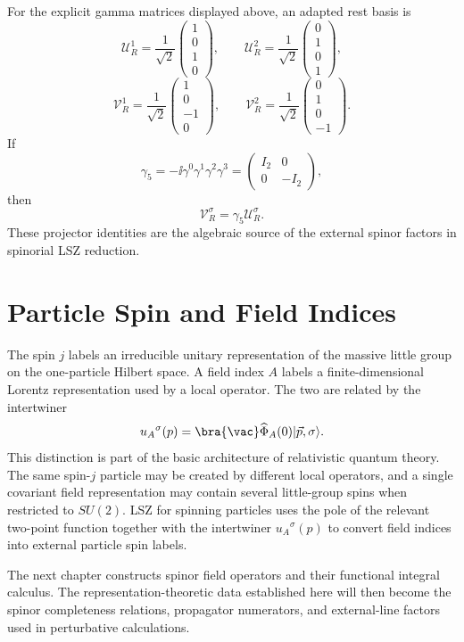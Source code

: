 For the explicit gamma matrices displayed above, an adapted rest basis is
\[
  \mathcal U_R^1=\frac{1}{\sqrt2}
  \begin{pmatrix}1\\0\\1\\0\end{pmatrix},
  \qquad
  \mathcal U_R^2=\frac{1}{\sqrt2}
  \begin{pmatrix}0\\1\\0\\1\end{pmatrix},
\]
\[
  \mathcal V_R^1=\frac{1}{\sqrt2}
  \begin{pmatrix}1\\0\\-1\\0\end{pmatrix},
  \qquad
  \mathcal V_R^2=\frac{1}{\sqrt2}
  \begin{pmatrix}0\\1\\0\\-1\end{pmatrix}.
\]
If
\[
  \gamma_5=-\ii\gamma^0\gamma^1\gamma^2\gamma^3
  =
  \begin{pmatrix}
    I_2&0\\ 0&-I_2
  \end{pmatrix},
\]
then
\[
  \mathcal V_R^\sigma=\gamma_5\mathcal U_R^\sigma .
\]
These projector identities are the algebraic source of the external spinor
factors in spinorial LSZ reduction.

\section{Particle Spin and Field Indices}

The spin \(j\) labels an irreducible unitary representation of the massive
little group on the one-particle Hilbert space. A field index \(A\) labels a
finite-dimensional Lorentz representation used by a local operator. The two
are related by the intertwiner
\[
  u_A{}^\sigma(p)
  =
  \bra{\vac}\widehat\Phi_A(0)|\vec p,\sigma\rangle .
\]
This distinction is part of the basic architecture of relativistic quantum
theory. The same spin-\(j\) particle may be created by different local
operators, and a single covariant field representation may contain several
little-group spins when restricted to \(SU(2)\). LSZ for spinning particles
uses the pole of the relevant two-point function together with the
intertwiner \(u_A{}^\sigma(p)\) to convert field indices into external
particle spin labels.

The next chapter constructs spinor field operators and their functional
integral calculus. The representation-theoretic data established here will
then become the spinor completeness relations, propagator numerators, and
external-line factors used in perturbative calculations.
